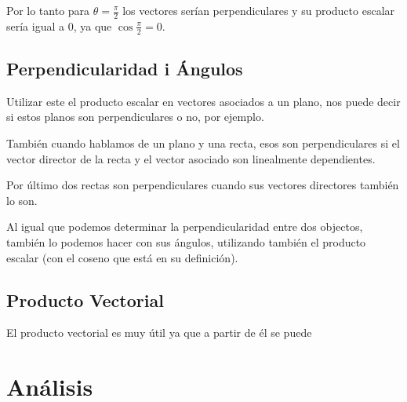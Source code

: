 \documentclass[arial,a4paper,print]{article}
\begin{document}
Por lo tanto para $\theta = \frac{\pi}{2}$ los vectores serían perpendiculares y su producto escalar sería igual a $0$, ya que $\cos\frac{\pi}{2} = 0$.

\subsection{Perpendicularidad i Ángulos}

Utilizar este el producto escalar en vectores asociados a un plano, nos puede decir si estos planos son perpendiculares o no, por ejemplo. 

También cuando hablamos de un plano y una recta, esos son perpendiculares si el vector director de la recta y el vector asociado son linealmente dependientes. 

Por último dos rectas son perpendiculares cuando sus vectores directores también lo son. 

Al igual que podemos determinar la perpendicularidad entre dos objectos, también lo podemos hacer con sus ángulos, utilizando también el producto escalar (con el coseno que está en su definición). 

\subsection{Producto Vectorial}
El producto vectorial es muy útil ya que a partir de él se puede 



\section{Análisis}
\end{document}
